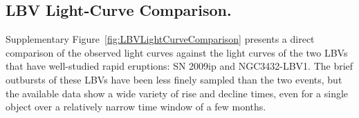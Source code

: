\subsection{LBV Light-Curve Comparison.}
\label{sec:LBVlightcurves}

Supplementary Figure~\ref{fig:LBVLightCurveComparison} presents a direct
comparison of the observed \spock light curves against the light
curves of the two LBVs that have well-studied rapid eruptions: SN
2009ip and NGC3432-LBV1. The brief outbursts of these LBVs have been
less finely sampled than the two \spock events, but the available data
show a wide variety of rise and decline times, even for a single
object over a relatively narrow time window of a few months.
